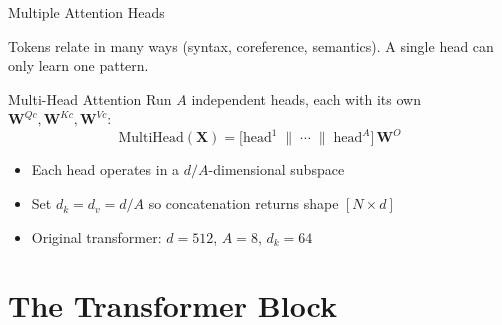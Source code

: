 \documentclass[aspectratio=169, professionalfonts]{beamer}
\begin{document}
\begin{frame}{Multiple Attention Heads}

Tokens relate in many ways (syntax, coreference, semantics).
A single head can only learn one pattern.

\bigskip

\begin{block}{Multi-Head Attention}
Run $A$ independent heads, each with its own
$\mathbf{W}^{Qc},\mathbf{W}^{Kc},\mathbf{W}^{Vc}$:
$$\text{MultiHead}(\mathbf{X})
  = \bigl[\text{head}^1 \;\|\; \cdots \;\|\;
          \text{head}^A\bigr]\,\mathbf{W}^O$$
\end{block}

\begin{itemize}
  \item Each head operates in a $d/A$-dimensional subspace
  \item Set $d_k = d_v = d/A$ so concatenation returns shape
        $[N \times d]$
  \item Original transformer: $d=512$, $A=8$, $d_k=64$
\end{itemize}

\end{frame}

\section{The Transformer Block}
\end{document}
